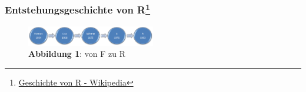 \documentclass[]{article}
\let\rmarkdownfootnote\footnote%
\def\footnote{\protect\rmarkdownfootnote}
\begin{document}
\subsubsection*{\texorpdfstring{Entstehungsgeschichte von R\footnote{\href{https://de.wikipedia.org/wiki/R_(Programmiersprache)\#Urspr\%C3\%BCnge_(1992)}{Geschichte
  von R - Wikipedia}}}{Entstehungsgeschichte von R}}\label{entstehungsgeschichte-von-r1}

\begin{figure}
\centering
\includegraphics[width=0.50000\textwidth]{Images/RHistorie.png}
\caption{\textbf{Abbildung 1}: von F zu R}
\end{figure}
\end{document}
